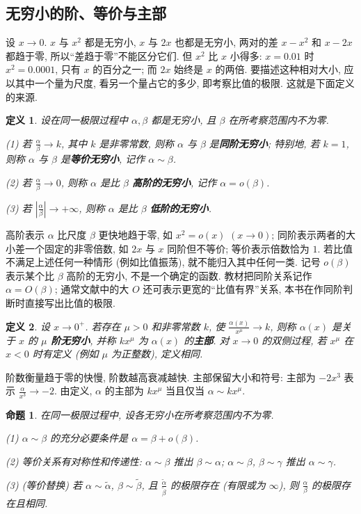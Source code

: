 \documentclass[UTF8,openany]{ctexbook}
\theoremstyle{chinesetextbook}
\newtheorem{definition}{定义}[section]
\newtheorem{proposition}{命题}[section]
\begin{document}
\subsection{无穷小的阶、等价与主部}
设 $x\to0$. $x$ 与 $x^2$ 都是无穷小, $x$ 与 $2x$ 也都是无穷小, 两对的差 $x-x^2$ 和 $x-2x$ 都趋于零, 所以“差趋于零”不能区分它们. 但 $x^2$ 比 $x$ 小得多: $x=0.01$ 时 $x^2=0.0001$, 只有 $x$ 的百分之一; 而 $2x$ 始终是 $x$ 的两倍. 要描述这种相对大小, 应以其中一个量为尺度, 看另一个量占它的多少, 即考察比值的极限. 这就是下面定义的来源.
\begin{definition}
设在同一极限过程中 $\alpha,\beta$ 都是无穷小, 且 $\beta$ 在所考察范围内不为零.

(1) 若 $\displaystyle\frac\alpha\beta\to k$, 其中 $k$ 是非零常数, 则称 $\alpha$ 与 $\beta$ 是\textbf{同阶无穷小}; 特别地, 若 $k=1$, 则称 $\alpha$ 与 $\beta$ 是\textbf{等价无穷小}, 记作 $\alpha\sim\beta$.

(2) 若 $\displaystyle\frac\alpha\beta\to0$, 则称 $\alpha$ 是比 $\beta$ \textbf{高阶的无穷小}, 记作 $\alpha=o(\beta)$.

(3) 若 $\displaystyle\left|\frac\alpha\beta\right|\to+\infty$, 则称 $\alpha$ 是比 $\beta$ \textbf{低阶的无穷小}.
\end{definition}
高阶表示 $\alpha$ 比尺度 $\beta$ 更快地趋于零, 如 $x^2=o(x)$ $(x\to0)$; 同阶表示两者的大小差一个固定的非零倍数, 如 $2x$ 与 $x$ 同阶但不等价; 等价表示倍数恰为 $1$. 若比值不满足上述任何一种情形 (例如比值振荡), 就不能归入其中任何一类. 记号 $o(\beta)$ 表示某个比 $\beta$ 高阶的无穷小, 不是一个确定的函数. 教材把同阶关系记作 $\alpha=O(\beta)$; 通常文献中的大 $O$ 还可表示更宽的“比值有界”关系, 本书在作同阶判断时直接写出比值的极限.
\begin{definition}
设 $x\to0^+$. 若存在 $\mu>0$ 和非零常数 $k$, 使 $\displaystyle\frac{\alpha(x)}{x^\mu}\to k$, 则称 $\alpha(x)$ 是关于 $x$ 的 \textbf{$\mu$ 阶无穷小}, 并称 $kx^\mu$ 为 $\alpha(x)$ 的\textbf{主部}. 对 $x\to0$ 的双侧过程, 若 $x^\mu$ 在 $x<0$ 时有定义 (例如 $\mu$ 为正整数), 定义相同.
\end{definition}
阶数衡量趋于零的快慢, 阶数越高衰减越快. 主部保留大小和符号: 主部为 $-2x^3$ 表示 $\displaystyle\frac{\alpha}{x^3}\to-2$. 由定义, $\alpha$ 的主部为 $kx^\mu$ 当且仅当 $\alpha\sim kx^\mu$.
\begin{proposition}
在同一极限过程中, 设各无穷小在所考察范围内不为零.

(1) $\alpha\sim\beta$ 的充分必要条件是 $\alpha=\beta+o(\beta)$.

(2) 等价关系有对称性和传递性: $\alpha\sim\beta$ 推出 $\beta\sim\alpha$; $\alpha\sim\beta$, $\beta\sim\gamma$ 推出 $\alpha\sim\gamma$.

(3) (等价替换) 若 $\alpha\sim\widetilde\alpha$, $\beta\sim\widetilde\beta$, 且 $\displaystyle\frac{\widetilde\alpha}{\widetilde\beta}$ 的极限存在 (有限或为 $\infty$), 则 $\displaystyle\frac\alpha\beta$ 的极限存在且相同.
\end{proposition}
\end{document}
